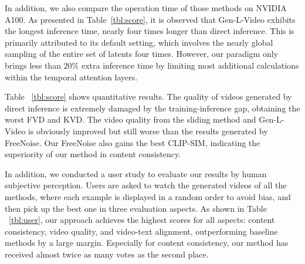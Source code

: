 In addition, we also compare the operation time of those methods on NVIDIA A100. As presented in Table~\ref{tbl:score}, it is observed that Gen-L-Video exhibits the longest inference time, nearly four times longer than direct inference. This is primarily attributed to its default setting, which involves the nearly global sampling of the entire set of latents four times. However, our paradigm only brings less than $20\%$ extra inference time by limiting most additional calculations within the temporal attention layers.

Table ~\ref{tbl:score} shows quantitative results. The quality of videos generated by direct inference is extremely damaged by the training-inference gap, obtaining the worst FVD and KVD. The video quality from the sliding method and Gen-L-Video is obviously improved but still worse than the results generated by FreeNoise. Our FreeNoise also gains the best CLIP-SIM, indicating the superiority of our method in content consistency.

In addition, we conducted a user study to evaluate our results by human subjective perception. Users are asked to watch the generated videos of all the methods, where each example is displayed in a random order to avoid bias, and then pick up the best one in three evaluation aspects. As shown in Table ~\ref{tbl:user}, our approach achieves the highest scores for all aspects: content consistency, video quality, and video-text alignment, outperforming baseline methods by a large margin. Especially for content consistency, our method has received almost twice as many votes as the second place.

\begin{table}[t]
\caption{User study. Users are required to pick the best one among our proposed FreeNoise with the other baseline methods in terms of content consistency, video quality, and video-text alignment.}\vspace{-0.5em}
% 
\label{tbl:user}
\begin{center}
\vspace{-1.0em}
\end{center}
\end{table}

